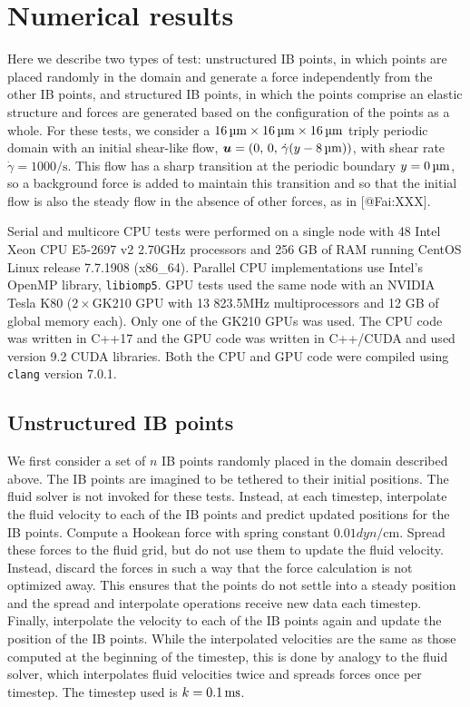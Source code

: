 \section{Numerical results}

Here we describe two types of test: unstructured IB points, in which points are
placed randomly in the domain and generate a force independently from the other
IB points, and structured IB points, in which the points comprise an elastic
structure and forces are generated based on the configuration of the points as
a whole. For these tests, we consider a $16\um\times16\um\times16\um$ triply
periodic domain with an initial shear-like flow,
$\vec{u} = (0,\,0,\,\dot{\gamma}(y-8\um))$, with shear rate
$\dot{\gamma} = 1000\si{\per\second}$. This flow has a sharp transition at the
periodic boundary $y=0\um$, so a background force is added to maintain this
transition and so that the initial flow is also the steady flow in the absence
of other forces, as in [@Fai:XXX].

Serial and multicore CPU tests were performed on a single node with 48
Intel\textsuperscript{\textregistered} Xeon\textsuperscript{\textregistered}
CPU E5-2697 v2 2.70\si{\giga\hertz} processors and 256 GB of RAM running CentOS
Linux release 7.7.1908 (x86\_64). Parallel CPU implementations use Intel's
OpenMP library, \texttt{libiomp5}. GPU tests used the same node with an
NVIDIA\textsuperscript{\textregistered} Tesla\textsuperscript{\textregistered}
K80 ($2\times$GK210 GPU with 13 823.5\si{\mega\hertz} multiprocessors and 12
GB of global memory each). Only one of the GK210 GPUs was used. The CPU code
was written in C++17 and the GPU code was written in C++/CUDA and used version
9.2 CUDA libraries. Both the CPU and GPU code were compiled using
\texttt{clang} version 7.0.1.

\subsection{Unstructured IB points}

We first consider a set of $n$ IB points randomly placed in the domain
described above. The IB points are imagined to be tethered to their initial
positions. The fluid solver is not invoked for these tests. Instead, at each
timestep, interpolate the fluid velocity to each of the IB points and predict
updated positions for the IB points. Compute a Hookean force with spring
constant $0.01\si{dyn\per\centi\meter}$. Spread these forces to the fluid grid,
but do not use them to update the fluid velocity. Instead, discard the forces
in such a way that the force calculation is not optimized away. This ensures
that the points do not settle into a steady position and the spread and
interpolate operations receive new data each timestep. Finally, interpolate the
velocity to each of the IB points again and update the position of the IB
points. While the interpolated velocities are the same as those computed at the
beginning of the timestep, this is done by analogy to the fluid solver, which
interpolates fluid velocities twice and spreads forces once per timestep. The
timestep used is $k = 0.1\ms$.

